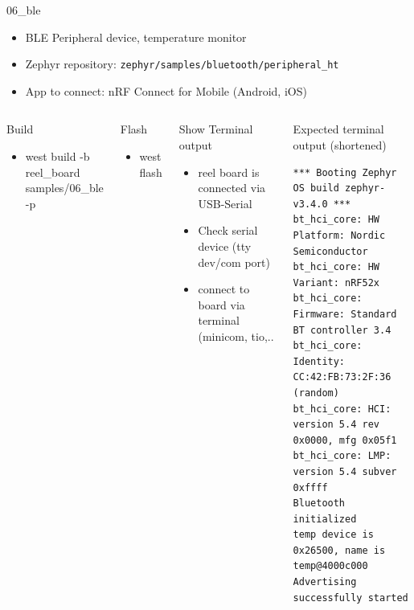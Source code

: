 \documentclass[10pt, aspectratio=169]{beamer}
\begin{document}
\begin{frame}[fragile]{06\_ble}

  \begin{itemize}
     \item BLE Peripheral device, temperature monitor
     \item Zephyr repository: \texttt{zephyr/samples/bluetooth/peripheral\_ht}
     \item App to connect: nRF Connect for Mobile (Android, iOS)
  \end{itemize}

  \begin{columns}[T,onlytextwidth]
      \begin{block}{Build}
        \begin{itemize}
          \item {\scriptsize west build -b reel\_board samples/06\_ble -p}
        \end{itemize}
      \end{block}

     \begin{block}{Flash}
        \begin{itemize}
          \item {\scriptsize west flash}
        \end{itemize}
      \end{block}

     \begin{block}{Show Terminal output}
        \begin{itemize}
	  \item {\scriptsize reel board is connected via USB-Serial}
	  \item {\scriptsize Check serial device (tty dev/com port)}
	  \item {\scriptsize connect to board via terminal (minicom, tio,..}
        \end{itemize}
      \end{block}



  \begin{exampleblock}{Expected terminal output (shortened)}

        {\fontsize{7}{9.6}\selectfont
          \begin{verbatim}
*** Booting Zephyr OS build zephyr-v3.4.0 ***
bt_hci_core: HW Platform: Nordic Semiconductor
bt_hci_core: HW Variant: nRF52x
bt_hci_core: Firmware: Standard BT controller 3.4
bt_hci_core: Identity: CC:42:FB:73:2F:36 (random)
bt_hci_core: HCI: version 5.4 rev 0x0000, mfg 0x05f1
bt_hci_core: LMP: version 5.4 subver 0xffff
Bluetooth initialized
temp device is 0x26500, name is temp@4000c000
Advertising successfully started
          \end{verbatim}
        }
      \end{exampleblock}

  \end{columns}

\end{frame}
\end{document}
